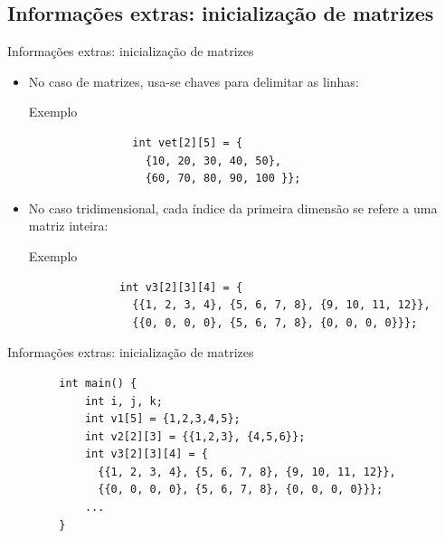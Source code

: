 \documentclass[handout]{beamer}
\begin{document}

\subsection{Informações extras: inicialização de matrizes}

\begin{frame}[fragile]{Informações extras: inicialização de matrizes}

    \begin{itemize}
        \item No caso de matrizes, usa-se chaves para delimitar as linhas:
        \begin{block}{Exemplo}
            \begin{verbatim}
                int vet[2][5] = {
                  {10, 20, 30, 40, 50},
                  {60, 70, 80, 90, 100 }};
            \end{verbatim}
        \end{block}

        \item No caso tridimensional, cada índice da primeira dimensão se refere a uma matriz inteira:

        \begin{block}{Exemplo}
            \begin{verbatim}
              int v3[2][3][4] = {
                {{1, 2, 3, 4}, {5, 6, 7, 8}, {9, 10, 11, 12}},
                {{0, 0, 0, 0}, {5, 6, 7, 8}, {0, 0, 0, 0}}};
            \end{verbatim}
        \end{block}
    \end{itemize}

\end{frame}

\begin{frame}[fragile]{Informações extras: inicialização de matrizes}

    \begin{verbatim}
        int main() {
            int i, j, k;
            int v1[5] = {1,2,3,4,5};
            int v2[2][3] = {{1,2,3}, {4,5,6}};
            int v3[2][3][4] = {
              {{1, 2, 3, 4}, {5, 6, 7, 8}, {9, 10, 11, 12}},
              {{0, 0, 0, 0}, {5, 6, 7, 8}, {0, 0, 0, 0}}};
            ...
        }
    \end{verbatim}

\end{frame}
\end{document}
